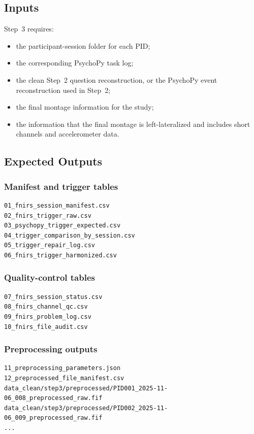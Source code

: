 \subsection{Inputs}
Step~3 requires:
\begin{itemize}
    \item the participant-session folder for each PID;
    \item the corresponding PsychoPy task log;
    \item the clean Step~2 question reconstruction, or the PsychoPy event reconstruction used in Step~2;
    \item the final montage information for the study;
    \item the information that the final montage is left-lateralized and includes short channels and accelerometer data.
\end{itemize}

\subsection{Expected Outputs}

\subsubsection*{Manifest and trigger tables}
\begin{verbatim}
01_fnirs_session_manifest.csv
02_fnirs_trigger_raw.csv
03_psychopy_trigger_expected.csv
04_trigger_comparison_by_session.csv
05_trigger_repair_log.csv
06_fnirs_trigger_harmonized.csv
\end{verbatim}

\subsubsection*{Quality-control tables}
\begin{verbatim}
07_fnirs_session_status.csv
08_fnirs_channel_qc.csv
09_fnirs_problem_log.csv
10_fnirs_file_audit.csv
\end{verbatim}

\subsubsection*{Preprocessing outputs}
\begin{verbatim}
11_preprocessing_parameters.json
12_preprocessed_file_manifest.csv
data_clean/step3/preprocessed/PID001_2025-11-06_008_preprocessed_raw.fif
data_clean/step3/preprocessed/PID002_2025-11-06_009_preprocessed_raw.fif
...
\end{verbatim}

